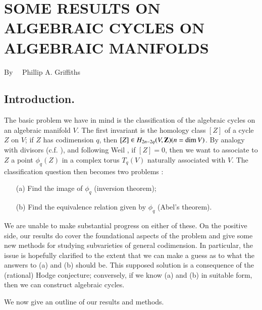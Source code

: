 \chapter[\textsc{P. A. Griffiths~:} Some Results on Algebraic Cycles on Algebraic Manifolds]{SOME RESULTS ON ALGEBRAIC CYCLES ON ALGEBRAIC MANIFOLDS}\label{art08}

\begin{center}
By~~ Phillip A. Griffiths
\end{center}

\setcounter{pageoriginal}{92}
\setcounter{section}{-1}
\section{Introduction.}\label{art08-sec0}\pageoriginale


The basic problem we have in mind is the classification of the algebraic cycles on an algebraic manifold $V$. The first invariant is the homology class $[Z]$ of a cycle $Z$ on $V$; if $Z$ has codimension $q$, then $[Z]\in H_{2n-2q}(V,\mathbf{Z})(n=\dim V)$. By analogy with divisors (c.f. \cite{art08-key18}), and following Weil \cite{art08-key22}, if $[Z]=0$, then we want to associate to $Z$ a point $\phi_{q}(Z)$ in a complex torus $T_{q}(V)$ naturally associated with $V$. The classification question then becomes two problems :
\begin{itemize}
\item[(a)] Find the image of $\phi_{q}$ (inversion theorem);

\item[(b)] Find the equivalence relation given by $\phi_{q}$ (Abel's theorem).
\end{itemize}

We are unable to make substantial progress on either of these. On the positive side, our results do cover the foundational aspects of the problem and give some new methods for studying subvarieties of general codimension. In particular, the issue is hopefully clarified to the extent that we can make a guess as to what the answers to (a) and (b) should be. This supposed solution is a consequence of the (rational) Hodge conjecture; conversely, if we know (a) and (b) in suitable form, then we can construct algebraic cycles.

We now give an outline of our results and methods.

